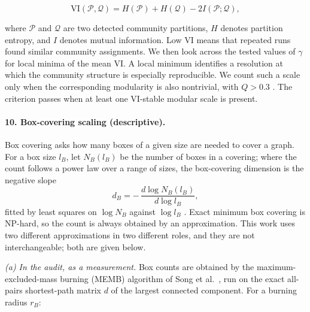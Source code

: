 \documentclass[12pt]{article}
\begin{document}
\[
\mathrm{VI}(\mathcal{P},\mathcal{Q})
=
H(\mathcal{P})
+
H(\mathcal{Q})
-
2I(\mathcal{P};\mathcal{Q}),
\]

where $\mathcal{P}$ and $\mathcal{Q}$ are two detected community
partitions, $H$ denotes partition entropy, and $I$ denotes mutual
information. Low VI means that repeated runs found similar community
assignments. We then look across the tested values of $\gamma$ for local
minima of the mean VI. A local minimum identifies a resolution at which
the community structure is especially reproducible. We count such a
scale only when the corresponding modularity is also nontrivial, with
$Q>0.3$ \cite{Meila2007,Betzel2017modular}. The criterion passes when at
least one VI-stable modular scale is present.



\paragraph{10. Box-covering scaling (descriptive).}
Box covering asks how many boxes of a given size are needed to cover a graph.
For a box size \(l_B\), let \(N_B(l_B)\) be the number of boxes in a covering;
where the count follows a power law over a range of sizes, the box-covering
dimension is the negative slope
\[
d_B
=
-\,\frac{d\log N_B(l_B)}{d\log l_B},
\]
fitted by least squares on \(\log N_B\) against \(\log l_B\)
\cite{Song2005,Song2007memb}.  Exact minimum box covering is NP-hard, so the
count is always obtained by an approximation.  This work uses two different
approximations in two different roles, and they are not interchangeable; both
are given below.

\emph{(a) In the audit, as a measurement.}  Box counts are obtained by the
maximum-excluded-mass burning (MEMB) algorithm of Song et al.\
\cite{Song2007memb}, run on the exact all-pairs shortest-path matrix \(d\) of
the largest connected component.  For a burning radius \(r_B\):
\end{document}
